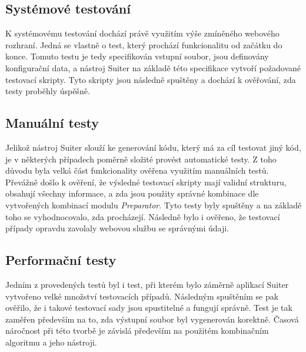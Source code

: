 \subsection*{Systémové testování}
K systémovému testování dochází právě využitím výše zmíněného webového rozhraní. Jedná se vlastně o test, který prochází funkcionalitu od začátku do konce. Tomuto testu je tedy specifikován vstupní soubor, jsou definovány konfigurační data, a nástroj Suiter na základě této specifikace vytvoří požadované testovací skripty. Tyto skripty jsou následně spuštěny a dochází k ověřování, zda testy proběhly úspěšně.



\subsection*{Manuální testy}

Jelikož nástroj Suiter slouží ke generování kódu, který má za cíl testovat jiný kód, je v některých případech poměrně složité provést automatické testy. Z toho důvodu byla velká část funkcionality ověřena využitím manuálních testů. Převážně došlo k ověření, že výsledné testovací skripty mají validní strukturu, obsahují všechny informace, a zda jsou použity správné kombinace dle vytvořených kombinací modulu \textit{Preparator}. Tyto testy byly spuštěny a na základě toho se vyhodnocovalo, zda procházejí. Následně bylo i ověřeno, že testovací případy opravdu zavolaly webovou službu se správnými údaji. 


\subsection*{Performační testy}

Jedním z provedených testů byl i test, při kterém bylo záměrně aplikací Suiter vytvořeno velké množství testovacích případů. Následným spuštěním se pak ověřilo, že i takové testovací sady jsou spustitelné a fungují správně. Test je tak zaměřen především na to, zda výstupní soubor byl vygenerován korektně. Časová náročnost při této tvorbě je závislá především na použitém kombinačním algoritmu a jeho nástroji. 

